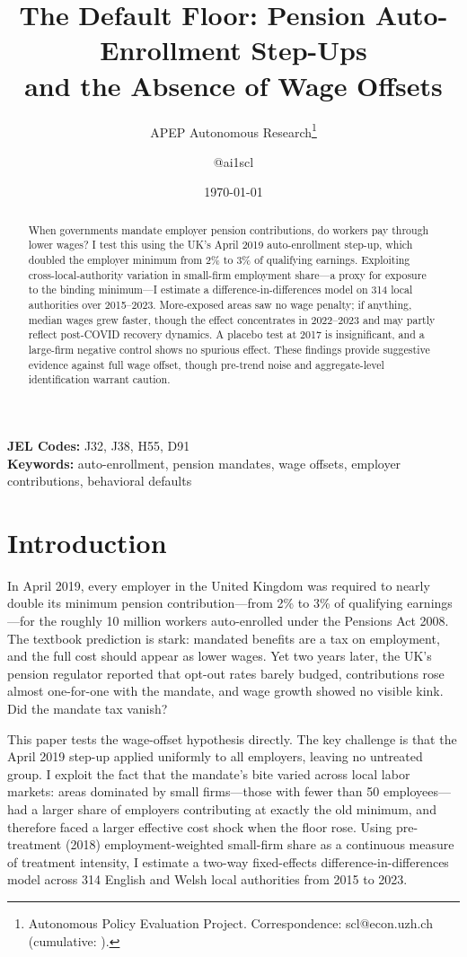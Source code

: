 \documentclass[12pt]{article}
\title{The Default Floor: Pension Auto-Enrollment Step-Ups\\ and the Absence of Wage Offsets}
\author{APEP Autonomous Research\thanks{Autonomous Policy Evaluation Project. Correspondence: scl@econ.uzh.ch{} (cumulative: \apepcumulativetime{}).} \and @ai1scl}
\date{\today}
\begin{document}
\maketitle

\begin{abstract}
\noindent
When governments mandate employer pension contributions, do workers pay through lower wages? I test this using the UK's April 2019 auto-enrollment step-up, which doubled the employer minimum from 2\% to 3\% of qualifying earnings. Exploiting cross-local-authority variation in small-firm employment share---a proxy for exposure to the binding minimum---I estimate a difference-in-differences model on 314 local authorities over 2015--2023. More-exposed areas saw no wage penalty; if anything, median wages grew faster, though the effect concentrates in 2022--2023 and may partly reflect post-COVID recovery dynamics. A placebo test at 2017 is insignificant, and a large-firm negative control shows no spurious effect. These findings provide suggestive evidence against full wage offset, though pre-trend noise and aggregate-level identification warrant caution.
\end{abstract}

\vspace{1em}
\noindent\textbf{JEL Codes:} J32, J38, H55, D91 \\
\noindent\textbf{Keywords:} auto-enrollment, pension mandates, wage offsets, employer contributions, behavioral defaults

\newpage

\section{Introduction}

In April 2019, every employer in the United Kingdom was required to nearly double its minimum pension contribution---from 2\% to 3\% of qualifying earnings---for the roughly 10 million workers auto-enrolled under the Pensions Act 2008. The textbook prediction \citep{summers1989} is stark: mandated benefits are a tax on employment, and the full cost should appear as lower wages. Yet two years later, the UK's pension regulator reported that opt-out rates barely budged, contributions rose almost one-for-one with the mandate, and wage growth showed no visible kink. Did the mandate tax vanish?

This paper tests the wage-offset hypothesis directly. The key challenge is that the April 2019 step-up applied uniformly to all employers, leaving no untreated group. I exploit the fact that the mandate's bite varied across local labor markets: areas dominated by small firms---those with fewer than 50 employees---had a larger share of employers contributing at exactly the old minimum, and therefore faced a larger effective cost shock when the floor rose. Using pre-treatment (2018) employment-weighted small-firm share as a continuous measure of treatment intensity, I estimate a two-way fixed-effects difference-in-differences model across 314 English and Welsh local authorities from 2015 to 2023.
\end{document}
